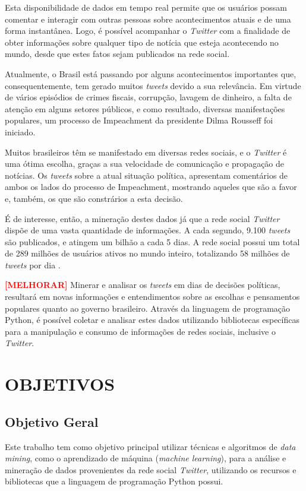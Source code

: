 Esta disponibilidade de dados em tempo real permite que os usuários possam comentar e interagir com outras pessoas sobre acontecimentos atuais e de uma forma instantânea. Logo, é possível acompanhar o \textit{Twitter} com a finalidade de obter informações sobre qualquer tipo de notícia que esteja acontecendo no mundo, desde que estes fatos sejam publicados na rede social.

Atualmente, o Brasil está passando por alguns acontecimentos importantes que, consequentemente, tem gerado muitos \textit{tweets} devido a sua relevância. Em virtude de vários episódios de crimes fiscais, corrupção, lavagem de dinheiro, a falta de atenção em alguns setores públicos, e como resultado, diversas manifestações populares, um processo de Impeachment da presidente Dilma Rousseff foi iniciado.

Muitos brasileiros têm se manifestado em diversas redes sociais, e o \textit{Twitter} é uma ótima escolha, graças a sua velocidade de comunicação e propagação de notícias. Os \textit{tweets} sobre a atual situação política, apresentam comentários de ambos os lados do processo de Impeachment, mostrando aqueles que são a favor e, também, os que são constrários a esta decisão.

É de interesse, então, a mineração destes dados já que a rede social \textit{Twitter} dispõe de uma vasta quantidade de informações. A cada segundo, 9.100 \textit{tweets} são publicados, e atingem um bilhão a cada 5 dias. A rede social possui um total de 289 milhões de usuários ativos no mundo inteiro, totalizando 58 milhões de \textit{tweets} por dia \cite{statistics}.

\textbf{\textcolor{red}{[MELHORAR]}} Minerar e analisar os \textit{tweets} em dias de decisões políticas, resultará em novas informações e entendimentos sobre as escolhas e pensamentos populares quanto ao governo brasileiro. Através da linguagem de programação Python, é possível coletar e analisar estes dados utilizando bibliotecas específicas para a manipulação e consumo de informações de redes sociais, inclusive o \textit{Twitter}.



\section{OBJETIVOS}\label{sec:objetivos}

\subsection{Objetivo Geral} 
Este trabalho tem como objetivo principal utilizar técnicas e algoritmos de \textit{data mining}, como o aprendizado de máquina (\textit{machine learning}), para a análise e mineração de dados provenientes da rede social \textit{Twitter}, utilizando os recursos e bibliotecas que a linguagem de programação Python possui.

